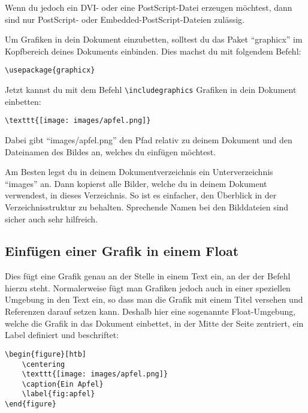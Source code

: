 Wenn du jedoch ein DVI- oder eine PostScript-Datei erzeugen möchtest, dann sind nur PostScript- oder Embedded-PostScript-Dateien zulässig.

Um Grafiken in dein Dokument einzubetten, solltest du das Paket \enquote{graphicx} im Kopfbereich deines Dokuments einbinden. Dies machst du mit folgendem Befehl:
\begin{lstlisting}
\usepackage{graphicx}
\end{lstlisting}

Jetzt kannst du mit dem Befehl \texttt{\textbackslash includegraphics} Grafiken in dein Dokument einbetten:
\begin{lstlisting}
\texttt{[image: images/apfel.png]}
\end{lstlisting}

Dabei gibt \enquote{images/apfel.png} den Pfad relativ zu deinem Dokument und den Dateinamen des Bildes an, welches du einfügen möchtest.

Am Besten legst du in deinem Dokumentverzeichnis ein Unterverzeichnis \enquote{images} an. Dann kopierst alle Bilder, welche du in deinem Dokument verwendest, in dieses Verzeichnis. So ist es einfacher, den Überblick in der Verzeichnisstruktur zu behalten. Sprechende Namen bei den Bilddateien sind sicher auch sehr hilfreich.

\subsection{Einfügen einer Grafik in einem Float}

Dies fügt eine Grafik genau an der Stelle in einem Text ein, an der der Befehl hierzu steht. Normalerweise fügt man Grafiken jedoch auch in einer speziellen Umgebung in den Text ein, so dass man die Grafik mit einem Titel versehen und Referenzen darauf setzen kann. Deshalb hier eine sogenannte Float-Umgebung, welche die Grafik in das Dokument einbettet, in der Mitte der Seite zentriert, ein Label definiert und beschriftet:
\begin{lstlisting}
\begin{figure}[htb]
	\centering
	\texttt{[image: images/apfel.png]}
	\caption{Ein Apfel}
	\label{fig:apfel}
\end{figure}
\end{lstlisting}

